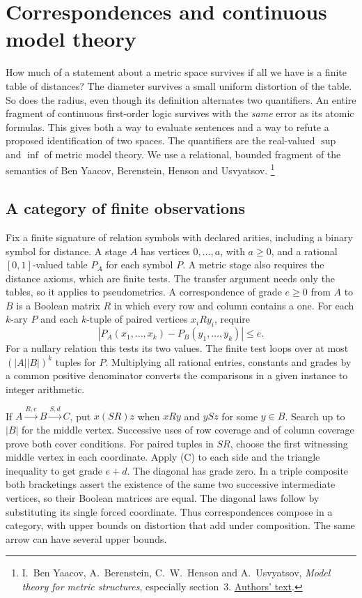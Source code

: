 \section{Correspondences and continuous model theory}
\label{sec:metric-logic}

How much of a statement about a metric space survives if all we have is a
finite table of distances? The diameter survives a small uniform distortion
of the table. So does the radius, even though its definition alternates two
quantifiers. An entire fragment of continuous first-order logic survives with
the \emph{same} error as its atomic formulas. This gives both a way to evaluate
sentences and a way to refute a proposed identification of two spaces. The
quantifiers are the real-valued $\sup$ and $\inf$ of metric model theory.
We use a relational, bounded fragment of the semantics of Ben Yaacov,
Berenstein, Henson and Usvyatsov.%
\footnote{I.~Ben Yaacov, A.~Berenstein, C.~W.~Henson and A.~Usvyatsov,
\emph{Model theory for metric structures}, especially section~3.
\href{https://math.univ-lyon1.fr/~begnac/articles/mtfms.pdf}{Authors' text}.}

\subsection{A category of finite observations}

Fix a finite signature of relation symbols with declared arities, including
a binary symbol for distance. A stage $A$ has vertices $0,\ldots,a$, with
$a\geq0$, and a rational $[0,1]$-valued table $P_A$ for each symbol $P$.
A metric stage also requires the distance axioms, which are finite tests.
The transfer argument needs only the tables, so it applies to pseudometrics.
A correspondence of grade $e\geq0$ from $A$ to $B$ is a Boolean matrix $R$
in which every row and column contains a one. For each $k$-ary $P$ and each
$k$-tuple of paired vertices $x_i R y_i$, require
\[
  |P_A(x_1,\ldots,x_k)-P_B(y_1,\ldots,y_k)|\leq e.             \tag{C}
\]
For a nullary relation this tests its two values. The finite test loops over
at most $(|A||B|)^k$ tuples for $P$. Multiplying all rational entries,
constants and grades by a common positive denominator converts the
comparisons in a given instance to integer arithmetic.

If $A\xrightarrow{R,e} B\xrightarrow{S,d} C$, put
$x(SR)z$ when $xRy$ and $ySz$ for some $y\in B$. Search up to $|B|$
for the middle vertex. Successive uses of row coverage and of column
coverage prove both cover conditions. For paired tuples in $SR$, choose
the first witnessing middle vertex in each coordinate. Apply (C) to each
side and the triangle inequality to get grade $e+d$. The diagonal has
grade zero. In a triple composite both bracketings assert the existence of
the same two successive intermediate vertices, so their Boolean matrices
are equal. The diagonal laws follow by substituting its single forced
coordinate. Thus correspondences compose in a category, with upper
bounds on distortion that add under composition. The same arrow can have
several upper bounds.

